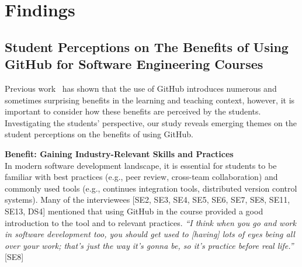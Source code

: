 \section{Findings} %
\label{sec:Findings}


\subsection{Student Perceptions on The Benefits of Using GitHub for Software Engineering Courses}
Previous work~\cite{zagalsky2015emergence} has shown that the use of GitHub introduces numerous and sometimes surprising benefits in the learning and teaching context, however, it is important to consider how these benefits are perceived by the students. Investigating the students' perspective, our study reveals emerging themes on the student perceptions on the benefits of using GitHub.


\textbf{Benefit: Gaining Industry-Relevant Skills and Practices}\\
In modern software development landscape, it is essential for students to be familiar with best practices (e.g., peer review, cross-team collaboration) and commonly used tools (e.g., continues integration tools, distributed version control systems). Many of the interviewees [SE2, SE3, SE4, SE5, SE6, SE7, SE8, SE11, SE13, DS4] mentioned that using GitHub in the course provided a good introduction to the tool and to relevant practices. \textit{``I think when you go and work in software development too, you should get used to [having] lots of eyes being all over your work; that's just the way it's gonna be, so it's practice before real life.''} [SE8]

